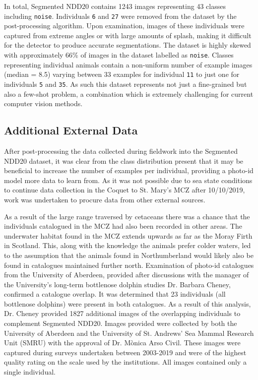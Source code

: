 In total, Segmented NDD20 contains 1243 images representing 43 classes including \texttt{noise}. Individuals \texttt{6} and \texttt{27} were removed from the dataset by the post-processing algorithm. Upon examination, images of these individuals were captured from extreme angles or with large amounts of splash, making it difficult for the detector to produce accurate segmentations. The dataset is highly skewed with approximately 66\% of images in the dataset labelled as \texttt{noise}. Classes representing individual animals contain a non-uniform number of example images (median = 8.5) varying between 33 examples for individual \texttt{11} to just one for individuals \texttt{5} and \texttt{35}. As such this dataset represents not just a fine-grained but also a few-shot problem, a combination which is extremely challenging for current computer vision methods. 

\subsection{Additional External Data}\label{ch:postProcessing,sec:NDD_AU_SMRU}

After post-processing the data collected during fieldwork into the Segmented NDD20 dataset, it was clear from the class distribution present that it may be beneficial to increase the number of examples per individual, providing a photo-id model more data to learn from. As it was not possible due to sea state conditions to continue data collection in the Coquet to St. Mary's MCZ after 10/10/2019, work was undertaken to procure data from other external sources. 

As a result of the large range traversed by cetaceans \cite{shane_ecology_1986} there was a chance that the individuals catalogued in the MCZ had also been recorded in other areas. The underwater habitat found in the MCZ extends upwards as far as the Moray Firth in Scotland. This, along with the knowledge the animals prefer colder waters, led to the assumption that the animals found in Northumberland would likely also be found in catalogues maintained further north. Examination of photo-id catalogues from the University of Aberdeen, provided after discussions with the manager of the University's long-term bottlenose dolphin studies Dr. Barbara Cheney, confirmed a catalogue overlap. It was determined that 23 individuals (all bottlenose dolphins) were present in both catalogues. As a result of this analysis, Dr. Cheney provided 1827 additional images of the overlapping individuals to complement Segmented NDD20. Images provided were collected by both the University of Aberdeen and the University of St. Andrews' Sea Mammal Research Unit (SMRU) with the approval of Dr. M\`{o}nica Arso Civil. These images were captured during surveys undertaken between 2003-2019 and were of the highest quality rating on the scale used by the institutions. All images contained only a single individual. 

